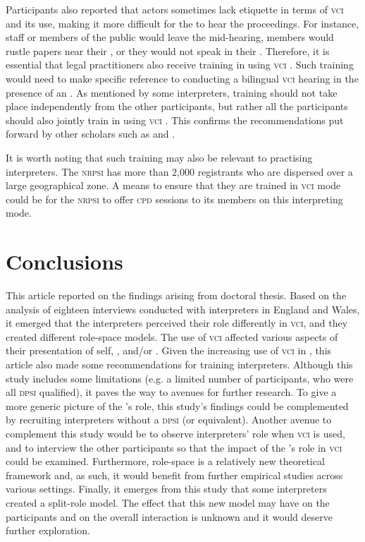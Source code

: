 \documentclass[output=paper]{langsci/langscibook}
\begin{document}
Participants also reported that  actors sometimes lack etiquette in terms of \textsc{vci}  and its use, making it more difficult for the  to hear the proceedings. For instance,  staff or members of the public would leave the  mid-hearing,  members would rustle papers near their , or they would not speak in their . Therefore, it is essential that legal practitioners also receive training in using \textsc{vci} . Such training would need to make specific reference to conducting a bilingual \textsc{vci} hearing in the presence of an . As mentioned by some interpreters, training should not take place independently from the other participants, but rather all the  participants should also jointly train in using \textsc{vci} . This confirms the recommendations put forward by other scholars such as \citet{Braun2011a} and \citet{Fowler2012}. 

It is worth noting that such training may also be relevant to practising  interpreters. The \textsc{nrpsi} has more than 2,000 registrants who are dispersed over a large geographical zone. A means to ensure that they are trained in \textsc{vci} mode could be for the \textsc{nrpsi} to offer \textsc{cpd} sessions to its members on this interpreting mode. 

\section{Conclusions}
\label{sec:devaux:7}
This article reported on the findings arising from  doctoral thesis. Based on the analysis of eighteen interviews conducted with  interpreters in England and Wales, it emerged that the interpreters perceived their role differently in \textsc{vci}, and they created different role-space models. The use of \textsc{vci}  affected various aspects of their presentation of self, , and/or . Given the increasing use of \textsc{vci}  in , this article also made some recommendations for training  interpreters. Although this study includes some limitations (e.g. a limited number of participants, who were all \textsc{dpsi} qualified), it paves the way to avenues for further research. To give a more generic picture of the ’s role, this study’s findings could be complemented by recruiting  interpreters without a \textsc{dpsi} (or equivalent). Another avenue to complement this study would be to observe  interpreters’ role when \textsc{vci} is used, and to interview the other  participants so that the impact of the ’s role in \textsc{vci} could be examined. Furthermore, role-space is a relatively new theoretical framework and, as such, it would benefit from further empirical studies across various settings. Finally, it emerges from this study that some interpreters created a split-role model. The effect that this new model may have on the  participants and on the overall interaction is unknown and it would deserve further exploration. 

{\sloppy\printbibliography[heading=subbibliography,notkeyword=this]} 
\end{document}
